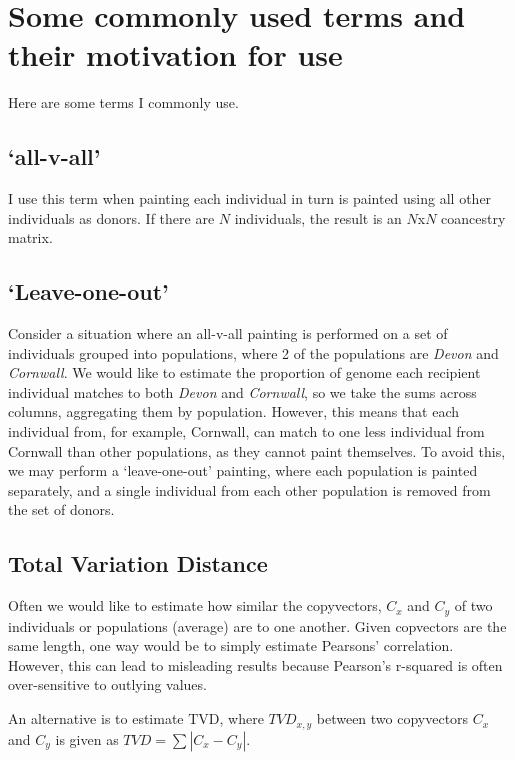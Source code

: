 \chapter{Some commonly used terms and their motivation for use}
\label{appendixlabel2}

Here are some terms I commonly use.

\section{`all-v-all'} \label{sec:allvall}

I use this term when painting each individual in turn is painted using all other individuals as donors. If there are $N$ individuals, the result is an $N$x$N$ coancestry matrix.


\section{`Leave-one-out'} \label{sec:leave_one_out}

Consider a situation where an all-v-all painting is performed on a set of individuals grouped into populations, where 2 of the populations are \textit{Devon} and \textit{Cornwall}. We would like to estimate the proportion of genome each recipient individual matches to both \textit{Devon} and \textit{Cornwall}, so we take the sums across columns, aggregating them by population. However, this means that each individual from, for example, Cornwall, can match to one less individual from Cornwall than other populations, as they cannot paint themselves. To avoid this, we may perform a `leave-one-out' painting, where each population is painted separately, and a single individual from each other population is removed from the set of donors. 

\section{Total Variation Distance} \label{sec:appendixTVD}

Often we would like to estimate how similar the copyvectors, $C_{x}$ and $C_{y}$ of two individuals or populations (average) are to one another. Given copvectors are the same length, one way would be to simply estimate Pearsons' correlation. However, this can lead to misleading results because Pearson's r-squared is often over-sensitive to outlying values.  

An alternative is to estimate TVD, where $TVD_{x,y}$ between two copyvectors $C_{x}$ and $C_{y}$ is given as $TVD = \sum |C_{x} - C_{y}|$. 




